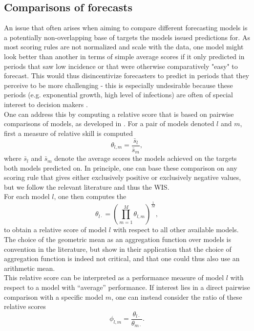 \subsection{Comparisons of forecasts} \label{sub:pairwise_comps}
An issue that often arises when aiming to compare different forecasting models is a potentially non-overlapping base of targets the models issued predictions for. As most scoring rules are not normalized and scale with the data, %
one model might look better than another in terms of simple average scores if it only predicted in periods that saw low incidence or that were otherwise comparatively "easy" to forecast. This would thus disincentivize forecasters to predict in periods that they perceive to be more challenging - this is especially undesirable because these periods (e.g. exponential growth, high level of infections) are often of special interest to decision makers .\\
One can address this by computing a relative score that is based on pairwise comparisons of models, as developed in \cite{cramer_evaluation_2022}. For a pair of models denoted $l$ and $m$, first a measure of relative skill is computed
\[
\theta_{l,m} = \frac{\bar{s}_{l}}{\bar{s}_{m}},
\]
where $\bar{s}_{l}$ and $\bar{s}_{m}$ denote the average scores the models achieved on the targets both models predicted on. In principle, one can base these comparison on any scoring rule that gives either exclusively positive or exclusively negative values, but we follow the relevant literature and thus the WIS.\\
For each model $l$, one then computes the 
\[
\theta_{l\cdot} = \left(\prod_{m = 1}^{M}\theta_{l,m} \right)^{\frac{1}{M}},
\]to obtain a relative score of model $l$ with respect to all other available models. The choice of the geometric mean as an aggregation function over models is convention in the literature, but \cite{ray_comparing_2022} show in their application that the choice of aggregation function is indeed not critical, and that one could thus also use an arithmetic mean. \\
This relative score can be interpreted as a performance measure of model $l$ with respect to a model with ``average'' performance. If interest lies in a direct pairwise comparison with a specific model $m$, one can instead consider the ratio of these relative scores
\begin{equation} \label{eq:mean_score_ratio}
\phi_{l,m} = \frac{\theta_{l\cdot}}{\theta_{m\cdot}}. 
\end{equation}
